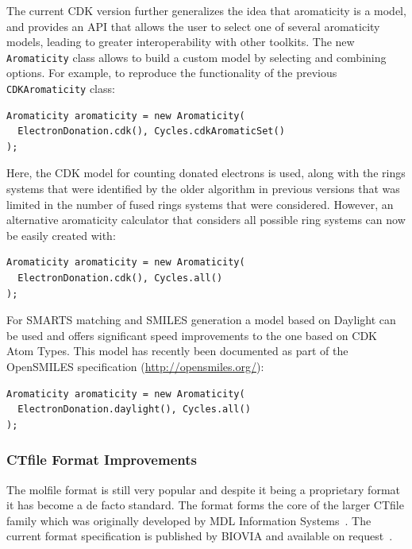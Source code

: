 \documentclass[10pt]{bmcart}
\begin{document}
The current CDK version further generalizes the idea that aromaticity
is a model, and provides an API that allows the user to select one of
several aromaticity models, leading to greater interoperability with
other toolkits. The new \texttt{Aromaticity} class allows to build a
custom model by selecting and combining options. For example, to
reproduce the functionality of the previous \texttt{CDKAromaticity} class:

\vspace{0.2cm}
\begin{verbatim}
Aromaticity aromaticity = new Aromaticity(
  ElectronDonation.cdk(), Cycles.cdkAromaticSet()
);
\end{verbatim}
\vspace{0.2cm}

Here, the CDK model for counting donated electrons is used, along with
the rings systems that were identified by the older algorithm in
previous versions that was limited in the number of fused rings
systems that were considered. However, an alternative aromaticity
calculator that considers all possible ring systems can now be
easily created with:

\vspace{0.2cm}
\begin{verbatim}
Aromaticity aromaticity = new Aromaticity(
  ElectronDonation.cdk(), Cycles.all()
);
\end{verbatim}
\vspace{0.2cm}

For SMARTS matching and SMILES generation a model based
on Daylight \cite{DaylightCIS} can be used and offers significant
speed improvements to the one based on CDK Atom Types. 
This model has recently been documented as part of the
OpenSMILES specification (\url{http://opensmiles.org/}):

\vspace{0.2cm}
\begin{verbatim}
Aromaticity aromaticity = new Aromaticity(
  ElectronDonation.daylight(), Cycles.all()
);
\end{verbatim}
\vspace{0.2cm}


\subsubsection*{CTfile Format Improvements}

The molfile format is still very popular and despite it being a proprietary
format it has become a de facto standard. The format forms the core of the larger
CTfile family which was originally developed by MDL Information Systems~\cite{Dalby92}. The
current format specification is published by BIOVIA and available on 
request~\cite{ctfilespec}.
 
\end{document}
